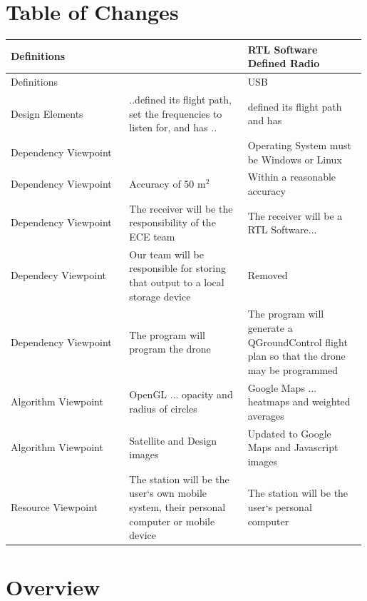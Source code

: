 \documentclass[onecolumn, draftclsnofoot,10pt, compsoc]{IEEEtran}
\begin{document}
\newpage
{}
\tableofcontents
\listoffigures
\clearpage

\section{Table of Changes}
\begin{center}
    \begin{tabular}{|p{0.33\linewidth}|p{0.33\linewidth}|p{0.33\linewidth}|}
    \hline
    Definitions & & RTL Software Defined Radio \\
    \hline
    Definitions & & USB \\
    \hline
    Design Elements & ..defined its flight path, set the frequencies to listen for, and has .. & defined its flight path and has \\
    \hline
    Dependency Viewpoint & & Operating System must be Windows or Linux \\
    \hline
    Dependency Viewpoint & Accuracy of 50 m$^2$ & Within a reasonable accuracy \\
    \hline
    Dependency Viewpoint & The receiver will be the responsibility of the ECE team & The receiver will be a RTL Software... \\
    \hline
    Dependecy Viewpoint & Our team will be responsible for storing that output to a local storage device & Removed \\
    \hline
    Dependency Viewpoint & The program will program the drone & The program will generate a QGroundControl flight plan so that the drone may be programmed \\
    \hline
    Algorithm Viewpoint & OpenGL ... opacity and radius of circles & Google Maps ... heatmaps and weighted averages \\
    \hline
    Algorithm Viewpoint & Satellite and Design images & Updated to Google Maps and Javascript images  \\
    \hline
    Resource Viewpoint & The station will be the user‘s own mobile system, their personal computer or mobile device & The station will be the user‘s  personal computer \\
    \hline
    \end{tabular}
\end{center}

\section{Overview}
\end{document}

